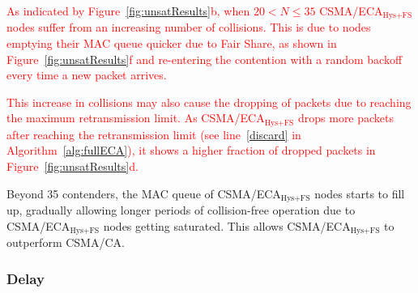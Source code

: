 	\textcolor{red}{As indicated by Figure~\ref{fig:unsatResults}b, when $20<N\leq 35$ CSMA/ECA$_{\text{Hys+FS}}$ nodes suffer from an increasing number of  collisions. This is due to nodes emptying their MAC queue quicker due to Fair Share, as shown in Figure~\ref{fig:unsatResults}f and re-entering the contention with a random backoff every time a new packet arrives.} 
	
	\textcolor{red}{This increase in collisions may also cause the dropping of packets due to reaching the maximum retransmission limit. As CSMA/ECA$_{\text{Hys+FS}}$ drops more packets after reaching the retransmission limit (see line~\ref{discard} in Algorithm~\ref{alg:fullECA}), it shows a higher fraction of dropped packets in Figure~\ref{fig:unsatResults}d.}
	
	Beyond 35 contenders, the MAC queue of CSMA/ECA$_{\text{Hys+FS}}$ nodes starts to fill up, gradually allowing longer periods of collision-free operation due to CSMA/ECA$_{\text{Hys+FS}}$ nodes getting saturated. This allows CSMA/ECA$_{\text{Hys+FS}}$ to outperform CSMA/CA.\\
		
	
	
	\subsubsection{Delay}
	

